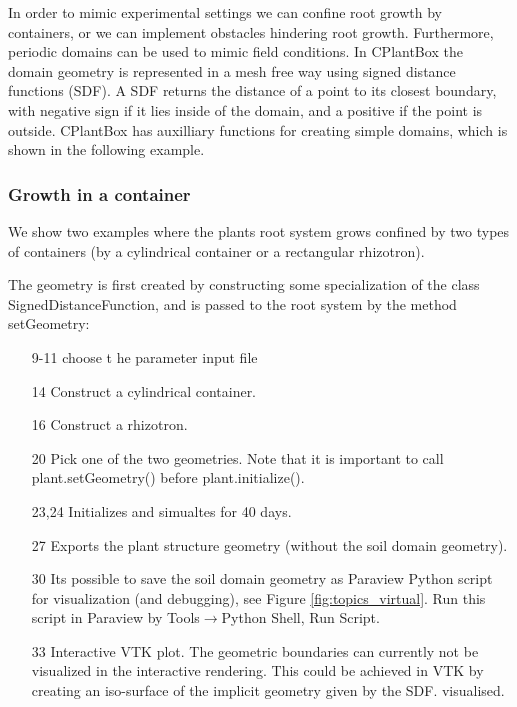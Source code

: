 In order to mimic experimental settings we can confine root growth by containers, or we can implement obstacles hindering root growth. Furthermore, periodic domains can be used to mimic field conditions. In CPlantBox the domain geometry is represented in a mesh free way using signed distance functions (SDF). A SDF returns the distance of a point to its closest boundary, with negative sign if it lies inside of the domain, and a positive if the point is outside. CPlantBox has auxilliary functions for creating simple domains, which is shown in the following example.

\subsubsection*{Growth in a container}

We show two examples where the plants root system grows confined by two types of containers 
(by a cylindrical container or a rectangular rhizotron). 



The geometry is first created by constructing some specialization of the class SignedDistanceFunction, 
and is passed to the root system by the method setGeometry: 
\begin{itemize}
 \item[9-11] choose t
 he parameter input file
 \item[14] Construct a cylindrical container. 
 \item[16] Construct a rhizotron.
 \item[20] Pick one of the two geometries. Note that it is important to call plant.setGeometry() before plant.initialize().
 \item[23,24] Initializes and simualtes for 40 days.
 \item[27] Exports the plant structure geometry (without the soil domain geometry).
 \item[30] Its possible to save the soil domain geometry as Paraview Python script for visualization (and debugging), see Figure \ref{fig:topics_virtual}. Run this script in Paraview by Tools$\rightarrow$Python Shell, Run Script. 
\item[33] Interactive VTK plot. The geometric boundaries can currently not be visualized in the interactive rendering. This could be achieved in VTK by creating an iso-surface of the implicit geometry given by the SDF. visualised. 
\end{itemize}

